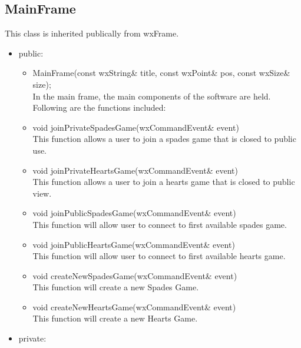 \documentclass[]{scrartcl}
\begin{document}
 \subsection{MainFrame}
 	This class is inherited publically from wxFrame.

 	\begin{itemize}
 		\item public:

 		\begin{itemize}
 			\item MainFrame(const wxString\& title, const wxPoint\& pos, const wxSize\& size);
 				\\ In the main frame, the main components of the software are held. Following are the functions included:

 			\item void joinPrivateSpadesGame(wxCommandEvent\& event) {}
 				\\This function allows a user to join a spades game that is closed to public use.

 			\item void joinPrivateHeartsGame(wxCommandEvent\& event) {}
 				\\ This function allows a user to join a hearts game that is closed to public view.

 			\item void joinPublicSpadesGame(wxCommandEvent\& event) {}
 				\\ This function will allow user to connect to first available spades game.

 			\item void joinPublicHeartsGame(wxCommandEvent\& event) {}
 				\\ This function will allow user to connect to first available hearts game.

 			\item void createNewSpadesGame(wxCommandEvent\& event) {}
 				\\	This function will create a new Spades Game.

 			\item void createNewHeartsGame(wxCommandEvent\& event) {}
 				\\ This function will create a new Hearts Game.

 		\end{itemize}

 		\item 	private:


\end{itemize}
\end{document}
